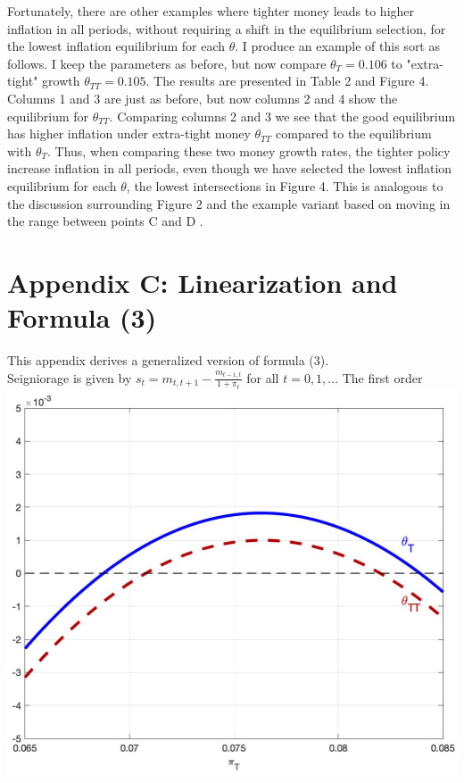 \documentclass[10pt]{article}
\begin{document}
Fortunately, there are other examples where tighter money leads to higher inflation in all periods, without requiring a shift in the equilibrium selection, for the lowest inflation equilibrium for each $\theta$. I produce an example of this sort as follows. I keep the parameters as before, but now compare $\theta_{T}=0.106$ to "extra-tight" growth $\theta_{T T}=0.105$. The results are presented in Table 2 and Figure 4. Columns 1 and 3 are just as before, but now columns 2 and 4 show the equilibrium for $\theta_{T T}$. Comparing columns 2 and 3 we see that the good equilibrium has higher inflation under extra-tight money $\theta_{T T}$ compared to the equilibrium with $\theta_{T}$. Thus, when comparing these two money growth rates, the tighter policy increase inflation in all periods, even though we have selected the lowest inflation equilibrium for each $\theta$, the lowest intersections in Figure 4. This is analogous to the discussion surrounding Figure 2 and the example variant based on moving in the range between points C and D .

\section*{Appendix C: Linearization and Formula (3)}
This appendix derives a generalized version of formula (3).\\
Seigniorage is given by $s_{t}=m_{t, t+1}-\frac{m_{t-1, t}}{1+\pi_{t}}$ for all $t=0,1, \ldots$ The first order\\
\includegraphics[max width=\textwidth, center]{2024_12_20_6e24ae1385cdc0ea3304g-19}
\end{document}
